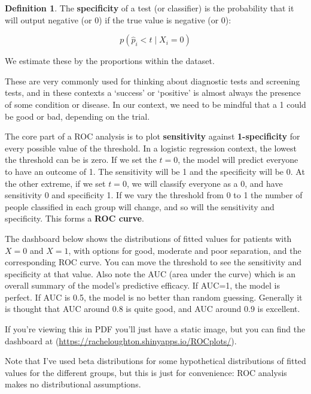 \documentclass[
  openany]{book}
\theoremstyle{definition}
\newtheorem{definition}{Definition}[chapter]
\theoremstyle{definition}
\theoremstyle{definition}
\theoremstyle{definition}
\theoremstyle{remark}
\begin{document}
\begin{definition}
The \textbf{specificity} of a test (or classifier) is the probability that it will output negative (or 0) if the true value is negative (or 0):

\[p\left(\hat{p}_i < t \mid{X_i=0}\right) \]
\end{definition}

We estimate these by the proportions within the dataset.

These are very commonly used for thinking about diagnostic tests and screening tests, and in these contexts a `success' or `positive' is almost always the presence of some condition or disease. In our context, we need to be mindful that a 1 could be good or bad, depending on the trial.

The core part of a ROC analysis is to plot \textbf{sensitivity} against \textbf{1-specificity} for every possible value of the threshold. In a logistic regression context, the lowest the threshold can be is zero. If we set the \(t=0\), the model will predict everyone to have an outcome of 1. The sensitivity will be 1 and the specificity will be 0. At the other extreme, if we set \(t=0\), we will classify everyone as a 0, and have sensitivity 0 and specificity 1. If we vary the threshold from 0 to 1 the number of people classified in each group will change, and so will the sensitivity and specificity. This forms a \textbf{ROC curve}.

The dashboard below shows the distributions of fitted values for patients with \(X=0\) and \(X=1\), with options for good, moderate and poor separation, and the corresponding ROC curve. You can move the threshold to see the sensitivity and specificity at that value. Also note the AUC (area under the curve) which is an overall summary of the model's predictive efficacy. If AUC=1, the model is perfect. If AUC is 0.5, the model is no better than random guessing. Generally it is thought that AUC around 0.8 is quite good, and AUC around 0.9 is excellent.

If you're viewing this in PDF you'll just have a static image, but you can find the dashboard at (\url{https://racheloughton.shinyapps.io/ROCplots/}).

Note that I've used beta distributions for some hypothetical distributions of fitted values for the different groups, but this is just for convenience: ROC analysis makes no distributional assumptions.
\end{document}
